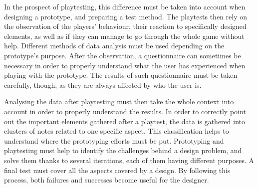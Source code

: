 In the prospect of playtesting, this difference must be taken into account when designing a prototype, and preparing a test method. The playtests then rely on the observation of the players' behaviour, their reaction to specifically designed elements, as well as if they can manage to go through the whole game without help. Different methods of data analysis must be used depending on the prototype's purpose. After the observation, a questionnaire can sometimes be necessary in order to properly understand what the user has experienced when playing with the prototype. The results of such questionnaire must be taken carefully, though, as they are always affected by who the user is.

Analysing the data after playtesting must then take the whole context into account in order to properly understand the results. In order to correctly point out the important elements gathered after a playtest, the data is gathered into clusters of notes related to one specific aspect. This classification helps to understand where the prototyping efforts must be put. Prototyping and playtesting must help to identify the challenges behind a design problem, and solve them thanks to several iterations, each of them having different purposes. A final test must cover all the aspects covered by a design. By following this process, both failures and successes become useful for the designer.

